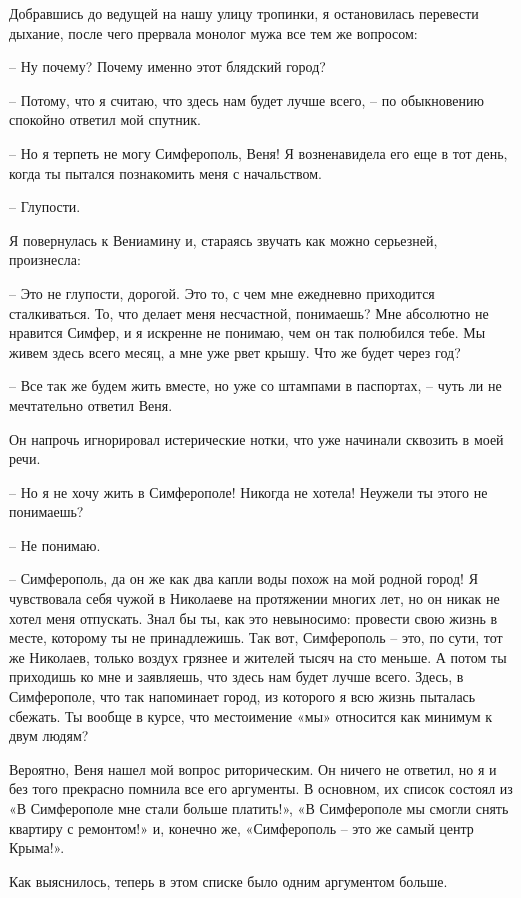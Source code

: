 \documentclass[
]{book}
\begin{document}
Добравшись до ведущей на нашу улицу тропинки, я остановилась перевести дыхание, после чего прервала монолог мужа все тем же вопросом:

-- Ну почему? Почему именно этот блядский город?

-- Потому, что я считаю, что здесь нам будет лучше всего, -- по обыкновению спокойно ответил мой спутник.

-- Но я терпеть не могу Симферополь, Веня! Я возненавидела его еще в тот день, когда ты пытался познакомить меня с начальством.

-- Глупости.

Я повернулась к Вениамину и, стараясь звучать как можно серьезней, произнесла:

-- Это не глупости, дорогой. Это то, с чем мне ежедневно приходится сталкиваться. То, что делает меня несчастной, понимаешь? Мне абсолютно не нравится Симфер, и я искренне не понимаю, чем он так полюбился тебе. Мы живем здесь всего месяц, а мне уже рвет крышу. Что же будет через год?

-- Все так же будем жить вместе, но уже со штампами в паспортах, -- чуть ли не мечтательно ответил Веня.

Он напрочь игнорировал истерические нотки, что уже начинали сквозить в моей речи.

-- Но я не хочу жить в Симферополе! Никогда не хотела! Неужели ты этого не понимаешь?

-- Не понимаю.

-- Симферополь, да он же как два капли воды похож на мой родной город! Я чувствовала себя чужой в Николаеве на протяжении многих лет, но он никак не хотел меня отпускать. Знал бы ты, как это невыносимо: провести свою жизнь в месте, которому ты не принадлежишь. Так вот, Симферополь -- это, по сути, тот же Николаев, только воздух грязнее и жителей тысяч на сто меньше. А потом ты приходишь ко мне и заявляешь, что здесь нам будет лучше всего. Здесь, в Симферополе, что так напоминает город, из которого я всю жизнь пыталась сбежать. Ты вообще в курсе, что местоимение «мы» относится как минимум к двум людям?

Вероятно, Веня нашел мой вопрос риторическим. Он ничего не ответил, но я и без того прекрасно помнила все его аргументы. В основном, их список состоял из «В Симферополе мне стали больше платить!», «В Симферополе мы смогли снять квартиру с ремонтом!» и, конечно же, «Симферополь -- это же самый центр Крыма!».

Как выяснилось, теперь в этом списке было одним аргументом больше.
\end{document}
